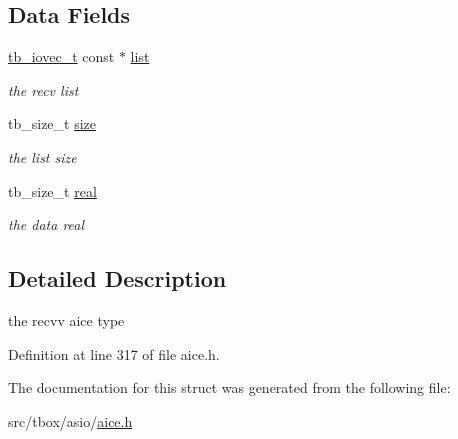 \subsection*{Data Fields}
\begin{DoxyCompactItemize}
\item 
\hypertarget{structtb__aice__recvv__t_a0746baa7b469a1dc1eee25572f6fbbd4}{\hyperlink{structtb__iovec__t}{tb\-\_\-iovec\-\_\-t} const $\ast$ \hyperlink{structtb__aice__recvv__t_a0746baa7b469a1dc1eee25572f6fbbd4}{list}}\label{structtb__aice__recvv__t_a0746baa7b469a1dc1eee25572f6fbbd4}

\begin{DoxyCompactList}\small\item\em the recv list \end{DoxyCompactList}\item 
\hypertarget{structtb__aice__recvv__t_a7043d3d614e6e1c06fe83e6cd142f100}{tb\-\_\-size\-\_\-t \hyperlink{structtb__aice__recvv__t_a7043d3d614e6e1c06fe83e6cd142f100}{size}}\label{structtb__aice__recvv__t_a7043d3d614e6e1c06fe83e6cd142f100}

\begin{DoxyCompactList}\small\item\em the list size \end{DoxyCompactList}\item 
\hypertarget{structtb__aice__recvv__t_a1321bc60b2b50537839358abd91f0379}{tb\-\_\-size\-\_\-t \hyperlink{structtb__aice__recvv__t_a1321bc60b2b50537839358abd91f0379}{real}}\label{structtb__aice__recvv__t_a1321bc60b2b50537839358abd91f0379}

\begin{DoxyCompactList}\small\item\em the data real \end{DoxyCompactList}\end{DoxyCompactItemize}


\subsection{Detailed Description}
the recvv aice type 

Definition at line 317 of file aice.\-h.



The documentation for this struct was generated from the following file\-:\begin{DoxyCompactItemize}
\item 
src/tbox/asio/\hyperlink{aice_8h}{aice.\-h}\end{DoxyCompactItemize}
